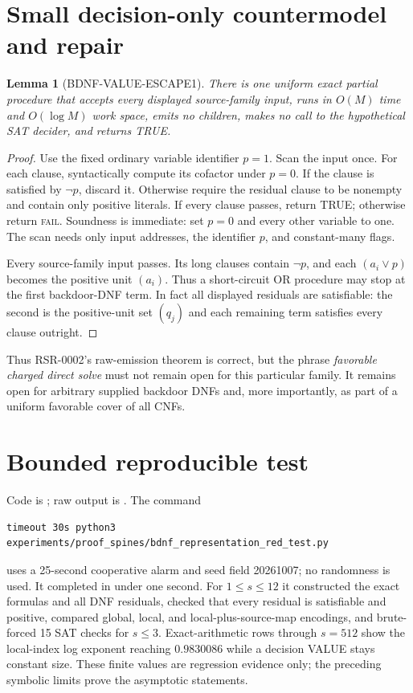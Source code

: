 \documentclass[11pt]{article}
\newtheorem{lemma}{Lemma}
\begin{document}
\section{Small decision-only countermodel and repair}
\begin{lemma}[BDNF-VALUE-ESCAPE1]
There is one uniform exact partial procedure that accepts every displayed
source-family input, runs in $O(M)$ time and $O(\log M)$ work space, emits
no children, makes no call to the hypothetical SAT decider, and returns TRUE.
\end{lemma}
\begin{proof}
Use the fixed ordinary variable identifier $p=1$.  Scan the input once.
For each clause, syntactically compute its cofactor under $p=0$.  If the
clause is satisfied by $\neg p$, discard it.  Otherwise require the residual
clause to be nonempty and contain only positive literals.  If every clause
passes, return TRUE; otherwise return \textsc{fail}.  Soundness is immediate:
set $p=0$ and every other variable to one.  The scan needs only input
addresses, the identifier $p$, and constant-many flags.

Every source-family input passes.  Its long clauses contain $\neg p$, and
each $(a_i\vee p)$ becomes the positive unit $(a_i)$.  Thus a short-circuit
OR procedure may stop at the first backdoor-DNF term.  In fact all displayed
residuals are satisfiable: the second is the positive-unit set $(q_j)$ and
each remaining term satisfies every clause outright.
\end{proof}

Thus RSR-0002's raw-emission theorem is correct, but the phrase
\emph{favorable charged direct solve} must not remain open for this
particular family.  It remains open for arbitrary supplied backdoor DNFs and,
more importantly, as part of a uniform favorable cover of all CNFs.

\section{Bounded reproducible test}
Code is
; raw output
is
.
The command
\begin{verbatim}
timeout 30s python3 experiments/proof_spines/bdnf_representation_red_test.py
\end{verbatim}
uses a 25-second cooperative alarm and seed field 20261007; no randomness is
used.  It completed in under one second.  For $1\le s\le12$ it constructed
the exact formulas and all DNF residuals, checked that every residual is
satisfiable and positive, compared global, local, and local-plus-source-map
encodings, and brute-forced 15 SAT checks for $s\le3$.  Exact-arithmetic
rows through $s=512$ show the local-index log exponent reaching
$0.9830086$ while a decision VALUE stays constant size.  These finite values
are regression evidence only; the preceding symbolic limits prove the
asymptotic statements.
\end{document}
